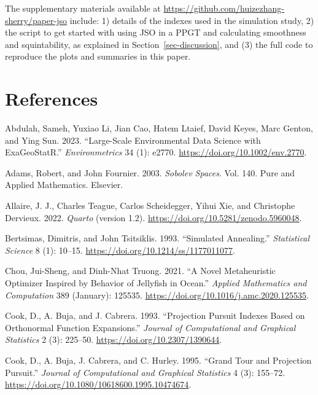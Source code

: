 \documentclass[
  12pt,
]{interact}
\newlength{\cslhangindent}
\newenvironment{CSLReferences}[2] %
 {\begin{list}{}{%
  \setlength{\itemindent}{0pt}
  \setlength{\leftmargin}{0pt}
  \setlength{\parsep}{0pt}
  \ifodd #1
   \setlength{\leftmargin}{\cslhangindent}
   \setlength{\itemindent}{-1\cslhangindent}
  \fi
  \setlength{\itemsep}{#2\baselineskip}}}
 {\end{list}}
\theoremstyle{plain}
\begin{document}
The supplementary materials available at
\url{https://github.com/huizezhang-sherry/paper-jso} include: 1) details
of the indexes used in the simulation study, 2) the script to get
started with using JSO in a PPGT and calculating smoothness and
squintability, as explained in Section~\ref{sec-discussion}, and (3) the
full code to reproduce the plots and summaries in this paper.

\section*{References}\label{references}

\label{refs}
\begin{CSLReferences}{1}{0}
Abdulah, Sameh, Yuxiao Li, Jian Cao, Hatem Ltaief, David Keyes, Marc
Genton, and Ying Sun. 2023. {``Large-Scale Environmental Data Science
with {ExaGeoStatR}.''} \emph{Environmetrics} 34 (1): e2770.
\url{https://doi.org/10.1002/env.2770}.

Adams, Robert, and John Fournier. 2003. \emph{Sobolev Spaces}. Vol. 140.
Pure and Applied Mathematics. Elsevier.

Allaire, J. J., Charles Teague, Carlos Scheidegger, Yihui Xie, and
Christophe Dervieux. 2022. \emph{{Quarto}} (version 1.2).
\url{https://doi.org/10.5281/zenodo.5960048}.

Bertsimas, Dimitris, and John Tsitsiklis. 1993. {``{Simulated
Annealing}.''} \emph{Statistical Science} 8 (1): 10--15.
\url{https://doi.org/10.1214/ss/1177011077}.

Chou, Jui-Sheng, and Dinh-Nhat Truong. 2021. {``A Novel Metaheuristic
Optimizer Inspired by Behavior of Jellyfish in Ocean.''} \emph{Applied
Mathematics and Computation} 389 (January): 125535.
\url{https://doi.org/10.1016/j.amc.2020.125535}.

Cook, D., A. Buja, and J. Cabrera. 1993. {``Projection Pursuit Indexes
Based on Orthonormal Function Expansions.''} \emph{Journal of
Computational and Graphical Statistics} 2 (3): 225--50.
\url{https://doi.org/10.2307/1390644}.

Cook, D., A. Buja, J. Cabrera, and C. Hurley. 1995. {``Grand Tour and
Projection Pursuit.''} \emph{Journal of Computational and Graphical
Statistics} 4 (3): 155--72.
\url{https://doi.org/10.1080/10618600.1995.10474674}.


\end{CSLReferences}
\end{document}
